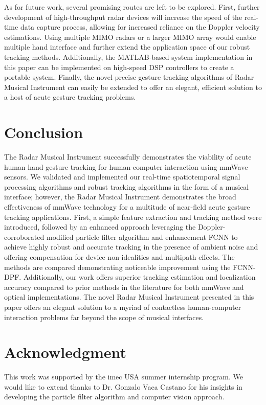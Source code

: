 \documentclass[10pt,journal,final]{IEEEtran}
\begin{document}
As for future work, several promising routes are left to be explored. First, further development of high-throughput radar devices will increase the speed of the real-time data capture process, allowing for increased reliance on the Doppler velocity estimations. Using multiple MIMO radars or a larger MIMO array would enable multiple hand interface and further extend the application space of our robust tracking methods. Additionally, the MATLAB-based system implementation in this paper can be implemented on high-speed DSP controllers to create a portable system. Finally, the novel precise gesture tracking algorithms of Radar Musical Instrument can easily be extended to offer an elegant, efficient solution to a host of acute gesture tracking problems. 

\section{Conclusion}
\label{sec:conclusion}

The Radar Musical Instrument successfully demonstrates the viability of acute human hand gesture tracking for human-computer interaction using mmWave sensors. We validated and implemented our real-time spatiotemporal signal processing algorithms and robust tracking algorithms in the form of a musical interface; however, the Radar Musical Instrument demonstrates the broad effectiveness of mmWave technology for a multitude of near-field acute gesture tracking applications. First, a simple feature extraction and tracking method were introduced, followed by an enhanced approach leveraging the Doppler-corroborated modified particle filter algorithm and enhancement FCNN to achieve highly robust and accurate tracking in the presence of ambient noise and offering compensation for device non-idealities and multipath effects. The methods are compared demonstrating noticeable improvement using the FCNN-DPF. Additionally, our work offers superior tracking estimation and localization accuracy compared to prior methods in the literature for both mmWave and optical implementations. The novel Radar Musical Instrument presented in this paper offers an elegant solution to a myriad of contactless human-computer interaction problems far beyond the scope of musical interfaces.

\section*{Acknowledgment}
This work was supported by the imec USA summer internship program. We would like to extend thanks to Dr. Gonzalo Vaca Castano for his insights in developing the particle filter algorithm and computer vision approach.



\end{document}
